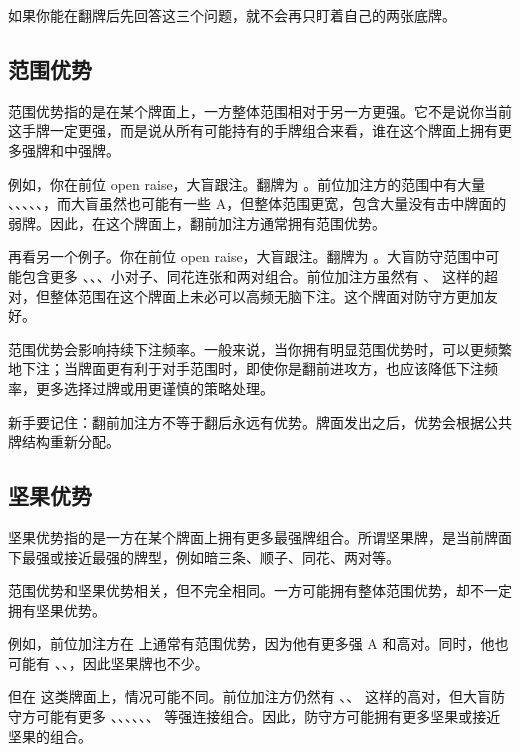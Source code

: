 如果你能在翻牌后先回答这三个问题，就不会再只盯着自己的两张底牌。

\subsection{范围优势}

范围优势指的是在某个牌面上，一方整体范围相对于另一方更强。它不是说你当前这手牌一定更强，而是说从所有可能持有的手牌组合来看，谁在这个牌面上拥有更多强牌和中强牌。

例如，你在前位 open raise，大盲跟注。翻牌为 。前位加注方的范围中有大量 、、、、、，而大盲虽然也可能有一些 A，但整体范围更宽，包含大量没有击中牌面的弱牌。因此，在这个牌面上，翻前加注方通常拥有范围优势。

再看另一个例子。你在前位 open raise，大盲跟注。翻牌为 。大盲防守范围中可能包含更多 、、、小对子、同花连张和两对组合。前位加注方虽然有 、 这样的超对，但整体范围在这个牌面上未必可以高频无脑下注。这个牌面对防守方更加友好。

范围优势会影响持续下注频率。一般来说，当你拥有明显范围优势时，可以更频繁地下注；当牌面更有利于对手范围时，即使你是翻前进攻方，也应该降低下注频率，更多选择过牌或用更谨慎的策略处理。

新手要记住：翻前加注方不等于翻后永远有优势。牌面发出之后，优势会根据公共牌结构重新分配。

\subsection{坚果优势}

坚果优势指的是一方在某个牌面上拥有更多最强牌组合。所谓坚果牌，是当前牌面下最强或接近最强的牌型，例如暗三条、顺子、同花、两对等。

范围优势和坚果优势相关，但不完全相同。一方可能拥有整体范围优势，却不一定拥有坚果优势。

例如，前位加注方在  上通常有范围优势，因为他有更多强 A 和高对。同时，他也可能有 、、，因此坚果牌也不少。

但在  这类牌面上，情况可能不同。前位加注方仍然有 、、 这样的高对，但大盲防守方可能有更多 、、、、、、 等强连接组合。因此，防守方可能拥有更多坚果或接近坚果的组合。

